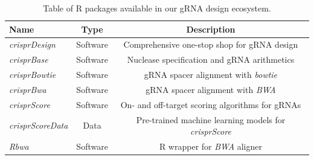 \documentclass[pdftex,english,10pt]{article}
\begin{document}
{%
\begin{table}[h!]
\centering
\begin{tabular}{l|c|c}
Name & Type & Description   \\ \hline
\textit{crisprDesign} & Software & Comprehensive one-stop shop for gRNA design   \\
\textit{crisprBase} & Software & Nuclease specification and gRNA arithmetics   \\
\textit{crisprBowtie} & Software & gRNA spacer alignment with \textit{bowtie}   \\
\textit{crisprBwa} & Software & gRNA spacer alignment with \textit{BWA}   \\   
\textit{crisprScore} & Software & On- and off-target scoring algorithms for gRNAs   \\
\textit{crisprScoreData} & Data & Pre-trained machine learning models for \textit{crisprScore}   \\
\textit{Rbwa} & Software & R wrapper for \textit{BWA} aligner \\
\end{tabular}
\caption{Table of R packages available in our gRNA design ecosystem. }
\label{supptab:packages}
\end{table}



}
\end{document}
